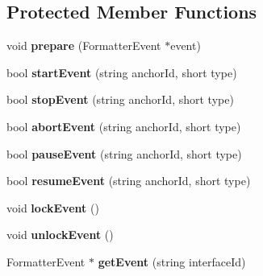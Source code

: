 \subsection*{Protected Member Functions}
\begin{CompactItemize}
\item 
void \textbf{prepare} (FormatterEvent $\ast$event)\label{classbr_1_1pucrio_1_1telemidia_1_1ginga_1_1ncl_1_1adapters_1_1remote_1_1RemotePlayerAdapter_031985ded10c444e2db49e40c828ab88}

\item 
bool \textbf{startEvent} (string anchorId, short type)\label{classbr_1_1pucrio_1_1telemidia_1_1ginga_1_1ncl_1_1adapters_1_1remote_1_1RemotePlayerAdapter_ad41686a46bcf6c89f70ab957885ff08}

\item 
bool \textbf{stopEvent} (string anchorId, short type)\label{classbr_1_1pucrio_1_1telemidia_1_1ginga_1_1ncl_1_1adapters_1_1remote_1_1RemotePlayerAdapter_971fe73c9725d5bae9ca030cf404496e}

\item 
bool \textbf{abortEvent} (string anchorId, short type)\label{classbr_1_1pucrio_1_1telemidia_1_1ginga_1_1ncl_1_1adapters_1_1remote_1_1RemotePlayerAdapter_e96e198e322e2b8d99fe5f5682dfa2a3}

\item 
bool \textbf{pauseEvent} (string anchorId, short type)\label{classbr_1_1pucrio_1_1telemidia_1_1ginga_1_1ncl_1_1adapters_1_1remote_1_1RemotePlayerAdapter_4eedc7289b5f1bc4a889f550268a4b25}

\item 
bool \textbf{resumeEvent} (string anchorId, short type)\label{classbr_1_1pucrio_1_1telemidia_1_1ginga_1_1ncl_1_1adapters_1_1remote_1_1RemotePlayerAdapter_ddb9287c453f55ee0f7431be23cf73af}

\item 
void \textbf{lockEvent} ()\label{classbr_1_1pucrio_1_1telemidia_1_1ginga_1_1ncl_1_1adapters_1_1remote_1_1RemotePlayerAdapter_ab9544acc633c3be1ecbf645a8ba1692}

\item 
void \textbf{unlockEvent} ()\label{classbr_1_1pucrio_1_1telemidia_1_1ginga_1_1ncl_1_1adapters_1_1remote_1_1RemotePlayerAdapter_c8d60ce5b32cb745777c282c60a58074}

\item 
FormatterEvent $\ast$ \textbf{getEvent} (string interfaceId)\label{classbr_1_1pucrio_1_1telemidia_1_1ginga_1_1ncl_1_1adapters_1_1remote_1_1RemotePlayerAdapter_e2e0a89e93c08da3a576b332c7550298}

\end{CompactItemize}
